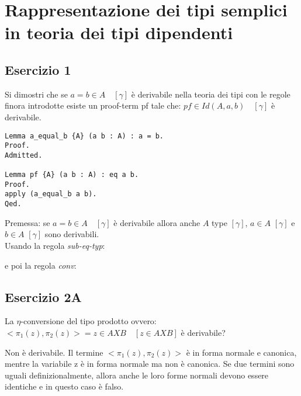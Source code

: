 \newpage
\section{Rappresentazione dei tipi semplici in teoria dei tipi dipendenti}

\subsection{Esercizio 1}

Si dimostri che se $a = b \in A \quad [\gamma]$ è derivabile nella teoria dei tipi
con le regole finora introdotte esiste un proof-term pf tale che:
$pf \in Id(A, a, b) \quad [\gamma]$ è derivabile.

\begin{lstlisting}[language=Coq]
Lemma a_equal_b {A} (a b : A) : a = b.
Proof.
Admitted.

Lemma pf {A} (a b : A) : eq a b.
Proof.
apply (a_equal_b a b).
Qed.
\end{lstlisting}

Premessa: se $a = b \in A \quad [\gamma]$ è derivabile allora anche
$A$ type $[\gamma]$, $a \in A$ $[\gamma]$ e $b \in A$ $[\gamma]$
sono derivabili.\\

Usando la regola \textit{sub-eq-typ}:

\begin{prooftree}
\end{prooftree}

e poi la regola \textit{conv}:

\begin{prooftree}
\end{prooftree}

\subsection{Esercizio 2A}

La $\eta$-conversione del tipo prodotto ovvero:
$<\pi_1(z),\pi_2(z)> = z \in A X B \quad [z \in A X B]$
è derivabile?

Non è derivabile. Il termine $<\pi_1(z),\pi_2(z)>$ è in forma normale e canonica,
mentre la variabile z è in forma normale ma non è canonica.
Se due termini sono uguali definizionalmente, allora anche le loro forme normali
devono essere identiche e in questo caso è falso.

